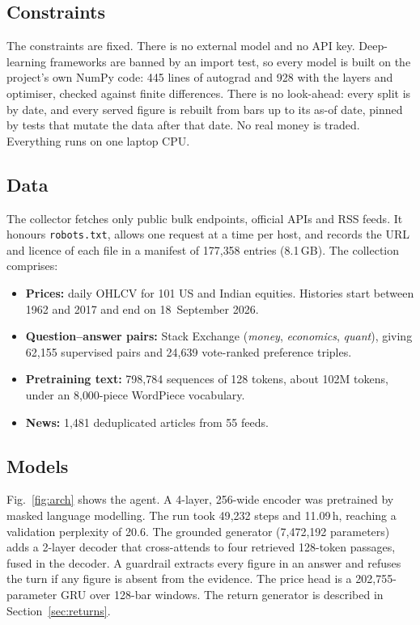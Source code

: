 \documentclass[conference]{IEEEtran}
\begin{document}
\subsection{Constraints}
The constraints are fixed. There is no external model and no API key. Deep-learning frameworks are
banned by an import test, so every model is built on the project's own NumPy code: 445 lines of
autograd and 928 with the layers and optimiser, checked against finite differences. There is no look-ahead: every split is by date, and every served
figure is rebuilt from bars up to its as-of date, pinned by tests that mutate the data after that
date. No real money is traded. Everything runs on one laptop CPU.

\subsection{Data}
The collector fetches only public bulk endpoints, official APIs and RSS feeds. It honours
\texttt{robots.txt}, allows one request at a time per host, and records the URL and licence of each
file in a manifest of 177{,}358 entries (8.1\,GB). The collection comprises:
\begin{itemize}
\item \textbf{Prices:} daily OHLCV for 101 US and Indian equities. Histories start between 1962 and
2017 and end on 18~September 2026.
\item \textbf{Question--answer pairs:} Stack Exchange (\emph{money}, \emph{economics},
\emph{quant}), giving 62{,}155 supervised pairs and 24{,}639 vote-ranked preference triples.
\item \textbf{Pretraining text:} 798{,}784 sequences of 128 tokens, about 102M tokens, under an
8{,}000-piece WordPiece vocabulary.
\item \textbf{News:} 1{,}481 deduplicated articles from 55 feeds.
\end{itemize}

\subsection{Models}
Fig.~\ref{fig:arch} shows the agent. A 4-layer, 256-wide encoder was pretrained by masked language
modelling. The run took 49{,}232 steps and 11.09\,h, reaching a validation perplexity of 20.6. The
grounded generator (7{,}472{,}192 parameters) adds a 2-layer decoder that cross-attends to four
retrieved 128-token passages, fused in the decoder. A guardrail extracts every figure in an answer
and refuses the turn if any figure is absent from the evidence. The price head is a 202{,}755-parameter
GRU over 128-bar windows. The return generator is described in Section~\ref{sec:returns}.
\end{document}
